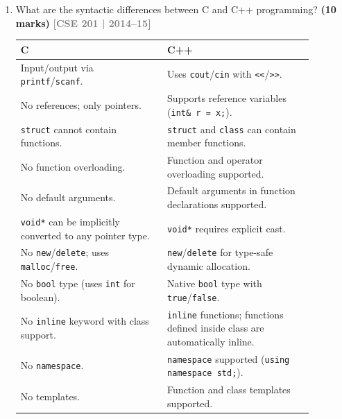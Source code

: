 \documentclass[12pt,a3paper]{article}
\newcommand{\yr}[1]{\hfill\textcolor{gray}{\small\textbf{[#1]}}}
\newcommand{\mk}[1]{\textcolor{orange!70!black}{\small\textbf{(#1 marks)}}}
\begin{document}
\begin{enumerate}
\begin{tcolorbox}[enhanced,breakable,ansbox,colback=cA!4,colframe=cA,
  boxrule=0.8pt,arc=5pt,
  title={\textbf{Answer}},fonttitle=\bfseries\color{white},colbacktitle=cA]
\end{tcolorbox}

\item What are the syntactic differences between C and C++ programming? \mk{10}
\yr{CSE 201 | 2014--15}

\begin{tcolorbox}[enhanced,breakable,ansbox,colback=cA!4,colframe=cA,
  boxrule=0.8pt,arc=5pt,
  title={\textbf{Answer}},fonttitle=\bfseries\color{white},colbacktitle=cA]

\begin{center}
\small
\begin{tabular}{@{}p{0.44\linewidth}p{0.44\linewidth}@{}}
\toprule
\textbf{C} & \textbf{C++} \\
\midrule
Input/output via \texttt{printf}/\texttt{scanf}. &
Uses \texttt{cout}/\texttt{cin} with \texttt{<<}/\texttt{>>}. \\[3pt]
No references; only pointers. &
Supports reference variables (\texttt{int\& r = x;}). \\[3pt]
\texttt{struct} cannot contain functions. &
\texttt{struct} and \texttt{class} can contain member functions. \\[3pt]
No function overloading. &
Function and operator overloading supported. \\[3pt]
No default arguments. &
Default arguments in function declarations supported. \\[3pt]
\texttt{void*} can be implicitly converted to any pointer type. &
\texttt{void*} requires explicit cast. \\[3pt]
No \texttt{new}/\texttt{delete}; uses \texttt{malloc}/\texttt{free}. &
\texttt{new}/\texttt{delete} for type-safe dynamic allocation. \\[3pt]
No \texttt{bool} type (uses \texttt{int} for boolean). &
Native \texttt{bool} type with \texttt{true}/\texttt{false}. \\[3pt]
No \texttt{inline} keyword with class support. &
\texttt{inline} functions; functions defined inside class are automatically inline. \\[3pt]
No \texttt{namespace}. &
\texttt{namespace} supported (\texttt{using namespace std;}). \\[3pt]
No templates. &
Function and class templates supported. \\
\bottomrule
\end{tabular}
\end{center}


\end{tcolorbox}
\end{enumerate}
\end{document}
